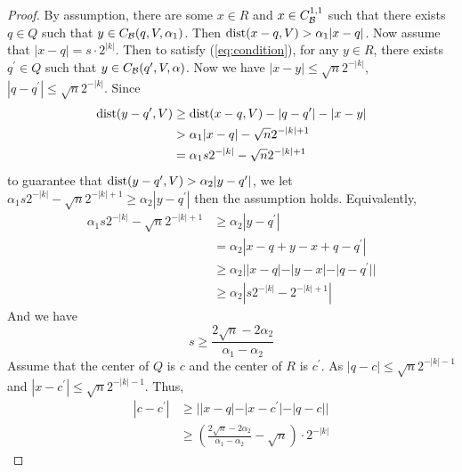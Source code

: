 \begin{proof} 
    By assumption, there are some $x\in R$ and $x\in C_\mathcal B^{1, 1}$ such that there exists $q\in Q$ such that $y\in C_\mathcal B(q, V, \alpha_1)$. Then $\operatorname{dist}(x-q, V) > \alpha_1|x-q|$. Now assume that $|x-q| = s\cdot 2^{|k|}$. Then to satisfy (\ref{eq:condition}), for any $y\in R$, there exists $q^\prime\in Q$ such that $y\in C_\mathcal B(q^\prime, V, \alpha)$. Now we have $|x-y|\leq \sqrt{n}2^{-|k|}$, $|q-q^\prime|\leq \sqrt{n}2^{-|k|}$. Since
    \begin{equation*}
        \begin{split}
            \operatorname{dist}(y-q^\prime, V) &\geq \operatorname{dist}(x-q, V)-|q-q^\prime|-|x-y| \\
            &> \alpha_1|x-q| - \sqrt{n}2^{-|k|+1}\\
            &= \alpha_1 s 2^{-|k|} - \sqrt{n}2^{-|k|+1}
        \end{split}
    \end{equation*}
    to guarantee that $\operatorname{dist}(y-q^\prime, V) > \alpha_2|y-q^\prime|$, we let $\alpha_1 s 2^{-|k|} - \sqrt{n}2^{-|k|+1} \geq  \alpha_2|y-q^\prime|$ then the assumption holds. Equivalently,
    \begin{equation*}
        \begin{split}
            \alpha_1 s 2^{-|k|} - \sqrt{n}2^{-|k|+1} &\geq  \alpha_2|y-q^\prime| \\
            &= \alpha_2 |x-q+y-x+q-q^\prime| \\
            &\geq \alpha_2||x-q|-|y-x|-|q-q^\prime||\\
            &\geq \alpha_2|s2^{-|k|}-2^{-|k|+1}|
        \end{split}
    \end{equation*}
    And we have 
    $$s\geq \frac{2\sqrt{n} - 2\alpha_2}{\alpha_1-\alpha_2}$$
    Assume that the center of $Q$ is $c$ and the center of $R$ is $c^\prime$. As $|q-c|\leq \sqrt{n}2^{-|k|-1}$ and $|x-c^\prime| \leq \sqrt{n}2^{-|k|-1}$. Thus,
    \begin{equation*}
        \begin{split}
            |c-c^\prime| &\geq ||x-q|-|x-c^\prime|-|q-c||\\
            &\geq (\frac{2\sqrt{n} - 2\alpha_2}{\alpha_1-\alpha_2}-\sqrt{n})\cdot 2^{-|k|}
        \end{split}
    \end{equation*}
\end{proof}
